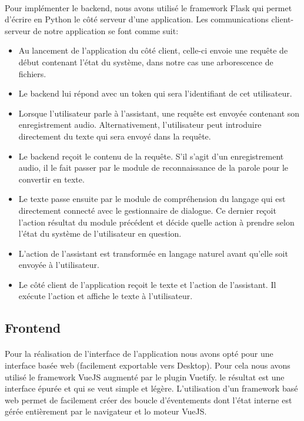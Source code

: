 \paragraph{}Pour implémenter le backend, nous avons utilisé le framework Flask qui permet d'écrire en Python le côté serveur d'une application. Les communications client-serveur de notre application se font comme suit:
\begin{itemize}
	\item Au lancement de l'application du côté client, celle-ci envoie une requête de début contenant l'état du système, dans notre cas une arborescence de fichiers. 
	\item Le backend lui répond avec un token qui sera l'identifiant de cet utilisateur.
	\item Lorsque l'utilisateur parle à l'assistant, une requête est envoyée contenant son enregistrement audio. Alternativement, l'utilisateur peut introduire directement du texte qui sera envoyé dans la requête.
	\item Le backend reçoit le contenu de la requête. S'il s'agit d'un enregistrement audio, il le fait passer par le module de reconnaissance de la parole pour le convertir en texte.
	\item Le texte passe ensuite par le module de compréhension du langage qui est directement connecté avec le gestionnaire de dialogue. Ce dernier reçoit l'action résultat du module précédent et décide quelle action à prendre selon l'état du système de l'utilisateur en question.
	\item L'action de l'assistant est transformée en langage naturel avant qu'elle soit envoyée à l'utilisateur.
	\item Le côté client de l'application reçoit le texte et l'action de l'assistant. Il exécute l'action et affiche le texte à l'utilisateur.
\end{itemize}

\subsection{Frontend}
\paragraph{}
Pour la réalisation de l'interface de l'application nous avons opté pour une interface basée web (facilement exportable vers Desktop). Pour cela nous avons utilisé le framework VueJS augmenté par le plugin Vuetify. le résultat est une interface épurée et qui se veut simple et légère. L'utilisation d'un framework basé web permet de facilement créer des boucle d'éventements dont l'état interne est gérée entièrement par le navigateur et lo moteur VueJS. 

